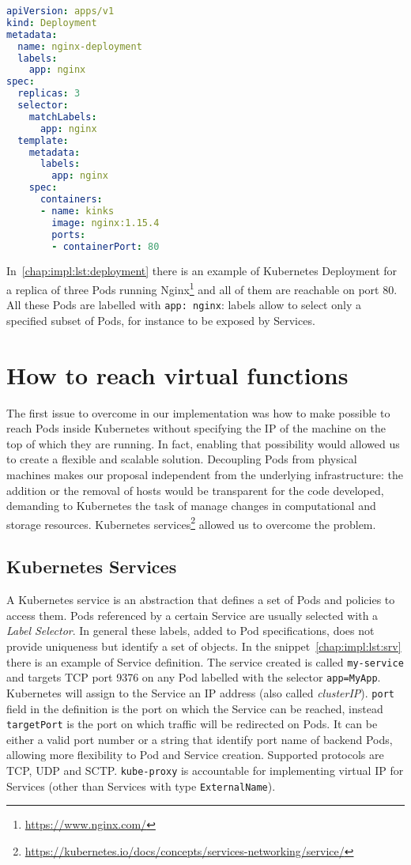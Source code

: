 \begin{lstlisting}[caption={Example of Deployment definition},
                   captionpos=b, language=yaml, label=chap:impl:lst:deployment]
apiVersion: apps/v1
kind: Deployment
metadata:
  name: nginx-deployment
  labels:
    app: nginx
spec:
  replicas: 3
  selector:
    matchLabels:
      app: nginx
  template:
    metadata:
      labels:
        app: nginx
    spec:
      containers:
      - name: kinks
        image: nginx:1.15.4
        ports:
        - containerPort: 80
\end{lstlisting}
In~\ref{chap:impl:lst:deployment} there is an example of Kubernetes Deployment
for a replica of three Pods running Nginx\footnote{\url{https://www.nginx.com/}}
and all of them are reachable on port $80$. All these Pods are labelled with
\texttt{app: nginx}: labels allow to select only a specified subset of Pods,
for instance to be exposed by Services.

\section{How to reach virtual functions}
The first issue to overcome in our implementation was how to make possible to
reach Pods inside Kubernetes without specifying the IP of the machine on the top
of which they are running. In fact, enabling that possibility would allowed us
to create a flexible and scalable solution. Decoupling Pods from physical
machines makes our proposal independent from the underlying infrastructure:
the
addition or the removal of hosts would be transparent for the code developed,
demanding to Kubernetes the task of manage changes in computational and
storage resources. Kubernetes
services\footnote{\url{https://kubernetes.io/docs/concepts/services-networking/service/}}
allowed us to overcome the problem.

\subsection{Kubernetes Services} \label{chap:impl:subsec:services}
A Kubernetes service is an abstraction that defines a set of Pods and policies
to access them. Pods referenced by a certain Service are usually selected with a
\emph{Label Selector}. In general these labels, added to Pod specifications,
does not provide uniqueness but identify a set of objects.
In the snippet~\ref{chap:impl:lst:srv} there is an example of Service
definition. The service created is called \texttt{my-service} and targets
TCP port 9376 on any Pod labelled with the selector \texttt{app=MyApp}.
Kubernetes will assign to the Service an IP address (also called 
\emph{clusterIP}). \texttt{port} field in the definition is the port on which
the Service can be
reached, instead \texttt{targetPort} is the port on which traffic will be
redirected on Pods. It can be either a valid port number or a string that
identify port name of backend Pods, allowing more flexibility to Pod and Service
creation. Supported protocols are TCP, UDP and SCTP. \texttt{kube-proxy} is
accountable for implementing virtual IP for Services (other than Services with
type \texttt{ExternalName}). 


